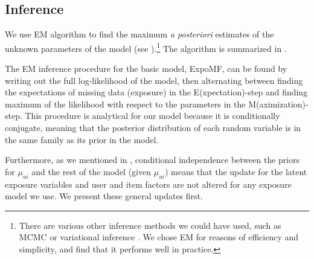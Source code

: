 

\subsection{Inference}
\label{sec:inference}
We use \gls{EM} algorithm to find the maximum \emph{a posteriori} estimates of the unknown parameters of the model (see ).\footnote{There are various other inference methods we could have used, such as \gls{MCMC} \citep{neal1993probabilistic,robert2013monte} or variational inference \citep{jordan1999introduction,wainwright2008graphical}. We chose \gls{EM} for reasons of efficiency and simplicity, and find that it performs well in practice.} The algorithm is summarized in .

The \gls{EM} inference procedure for the basic model, ExpoMF, 
can be found by writing out the full log-likelihood of the model, 
then alternating between finding the expectations of missing data (exposure)
in the E(xpectation)-step and finding maximum of the likelihood with respect to the parameters in the M(aximization)-step. 
This procedure is analytical for our model because it is conditionally conjugate, 
meaning that the posterior distribution of each random variable 
is in the same family as its prior in the model. 

Furthermore, as we mentioned in , conditional independence 
between the priors for $\mu_{ui}$ and the rest of the model (given $\mu_{ui}$) 
means that the update for the latent exposure variables and user and item factors are not altered for any exposure model we use. We present these general updates first.

